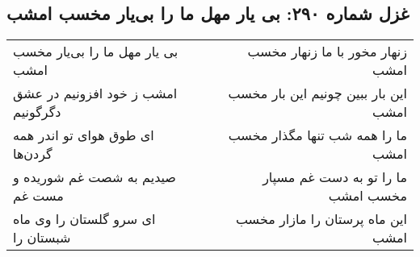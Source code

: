 \begin{center}
\section*{غزل شماره ۲۹۰: بی یار مهل ما را بی‌یار مخسب امشب}
\label{sec:0290}
\begin{longtable}{l p{0.5cm} r}
بی یار مهل ما را بی‌یار مخسب امشب
&&
زنهار مخور با ما زنهار مخسب امشب
\\
امشب ز خود افزونیم در عشق دگرگونیم
&&
این بار ببین چونیم این بار مخسب امشب
\\
ای طوق هوای تو اندر همه گردن‌ها
&&
ما را همه شب تنها مگذار مخسب امشب
\\
صیدیم به شصت غم شوریده و مست غم
&&
ما را تو به دست غم مسپار مخسب امشب
\\
ای سرو گلستان را وی ماه شبستان را
&&
این ماه پرستان را مازار مخسب امشب
\\
\end{longtable}
\end{center}
